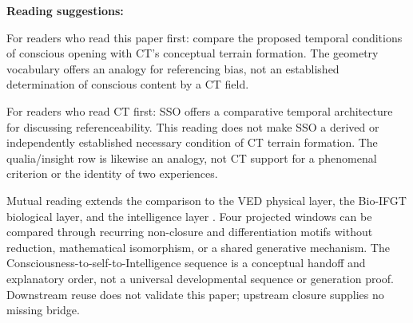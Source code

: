 \textbf{Reading suggestions:}

For readers who read this paper first: compare the proposed temporal
conditions of conscious opening with CT's conceptual terrain formation.
The geometry vocabulary offers an analogy for referencing bias, not an
established determination of conscious content by a CT field.

For readers who read CT first: SSO offers a comparative temporal architecture
for discussing referenceability. This reading does not make SSO a derived
or independently established necessary condition of CT terrain formation.
The qualia/insight row is likewise an analogy, not CT support for a
phenomenal criterion or the identity of two experiences.

Mutual reading extends the comparison to the VED physical layer, the
Bio-IFGT biological layer, and the intelligence layer \cite{Intelligence}.
Four projected windows can be compared through recurring non-closure and
differentiation motifs without reduction, mathematical isomorphism, or a
shared generative mechanism. The Consciousness-to-self-to-Intelligence
sequence is a conceptual handoff and explanatory order, not a universal
developmental sequence or generation proof. Downstream reuse does not
validate this paper; upstream closure supplies no missing bridge.
